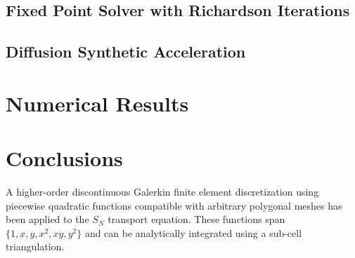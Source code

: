 \documentclass[preprint,review,10pt]{elsarticle}
\begin{document}
\subsection{Fixed Point Solver with Richardson Iterations} \label{sec::Solve_Rich}


\subsection{Diffusion Synthetic Acceleration} \label{sec::Solve_DSA}



\section{Numerical Results} \label{sec::results}



\section{Conclusions} \label{sec::conclusions}

A higher-order discontinuous Galerkin finite element discretization using piecewise quadratic functions compatible with arbitrary polygonal meshes has been applied to the $S_N$ transport equation. These functions span $\{ 1,x,y,x^2,xy,y^2 \}$ and can be analytically integrated using a sub-cell triangulation.

\end{document}
